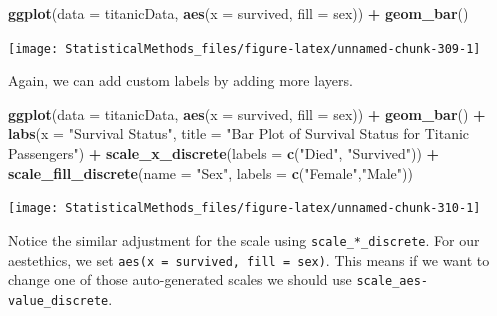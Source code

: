 \documentclass[
]{book}
\newenvironment{Shaded}{\begin{snugshade}}{\end{snugshade}}
\newcommand{\DataTypeTok}[1]{\textcolor[rgb]{0.13,0.29,0.53}{#1}}
\newcommand{\KeywordTok}[1]{\textcolor[rgb]{0.13,0.29,0.53}{\textbf{#1}}}
\newcommand{\NormalTok}[1]{#1}
\newcommand{\OperatorTok}[1]{\textcolor[rgb]{0.81,0.36,0.00}{\textbf{#1}}}
\newcommand{\StringTok}[1]{\textcolor[rgb]{0.31,0.60,0.02}{#1}}
\theoremstyle{definition}
\theoremstyle{definition}
\theoremstyle{definition}
\theoremstyle{remark}
\begin{document}
\begin{Shaded}
\begin{Highlighting}[]
\KeywordTok{ggplot}\NormalTok{(}\DataTypeTok{data =}\NormalTok{ titanicData, }\KeywordTok{aes}\NormalTok{(}\DataTypeTok{x =}\NormalTok{ survived, }\DataTypeTok{fill =}\NormalTok{ sex)) }\OperatorTok{+}\StringTok{ }\KeywordTok{geom_bar}\NormalTok{()}
\end{Highlighting}
\end{Shaded}

\begin{center}\texttt{[image: StatisticalMethods\_files/figure-latex/unnamed-chunk-309-1]} \end{center}

Again, we can add custom labels by adding more layers.

\begin{Shaded}
\begin{Highlighting}[]
\KeywordTok{ggplot}\NormalTok{(}\DataTypeTok{data =}\NormalTok{ titanicData, }\KeywordTok{aes}\NormalTok{(}\DataTypeTok{x =}\NormalTok{ survived, }\DataTypeTok{fill =}\NormalTok{ sex)) }\OperatorTok{+}\StringTok{ }
\StringTok{  }\KeywordTok{geom_bar}\NormalTok{() }\OperatorTok{+}
\StringTok{  }\KeywordTok{labs}\NormalTok{(}\DataTypeTok{x =} \StringTok{"Survival Status"}\NormalTok{, }
       \DataTypeTok{title =} \StringTok{"Bar Plot of Survival Status for Titanic Passengers"}\NormalTok{) }\OperatorTok{+}\StringTok{ }
\StringTok{  }\KeywordTok{scale_x_discrete}\NormalTok{(}\DataTypeTok{labels =} \KeywordTok{c}\NormalTok{(}\StringTok{"Died"}\NormalTok{, }\StringTok{"Survived"}\NormalTok{)) }\OperatorTok{+}\StringTok{ }
\StringTok{  }\KeywordTok{scale_fill_discrete}\NormalTok{(}\DataTypeTok{name =} \StringTok{"Sex"}\NormalTok{, }\DataTypeTok{labels =} \KeywordTok{c}\NormalTok{(}\StringTok{"Female"}\NormalTok{,}\StringTok{"Male"}\NormalTok{))}
\end{Highlighting}
\end{Shaded}

\begin{center}\texttt{[image: StatisticalMethods\_files/figure-latex/unnamed-chunk-310-1]} \end{center}

Notice the similar adjustment for the scale using \texttt{scale\_*\_discrete}. For our aestethics, we set \texttt{aes(x\ =\ survived,\ fill\ =\ sex)}. This means if we want to change one of those auto-generated scales we should use \texttt{scale\_aes-value\_discrete}.
\end{document}
